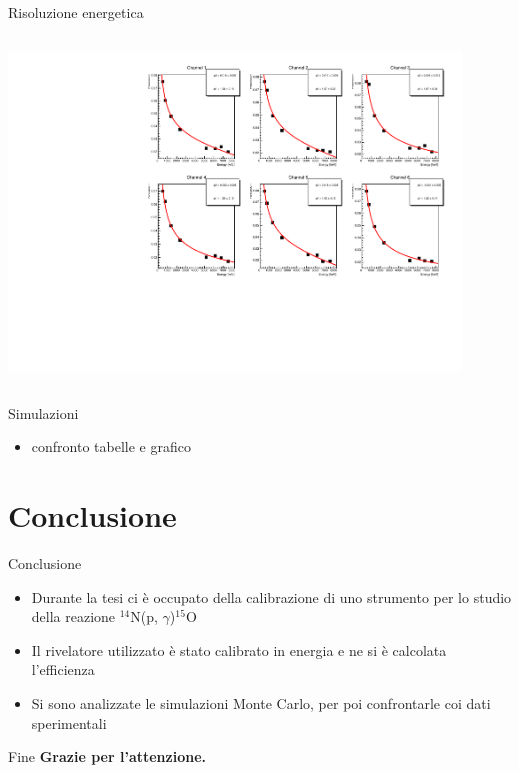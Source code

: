\documentclass [xcolor=svgnames] {beamer}
\begin{document}
\begin{frame}{Risoluzione energetica}
\begin{columns}
\begin{column}{0.5\textwidth}
{				\includegraphics[width=0.9\textwidth]{img/ResolutionGraphs.pdf}}
		\end{column}
	\end{columns}
\end{frame}

\begin{frame}{Simulazioni}
	\begin{itemize}
		\item confronto tabelle e grafico%
	\end{itemize}
\end{frame}
	
	\section{Conclusione}
	\begin{frame}{Conclusione}
		\begin{itemize}
			\item<1-> Durante la tesi ci è occupato della calibrazione di uno strumento per lo studio della reazione  $^{14}$N(p, $\gamma$)$^{15}$O
			\item<2-> Il rivelatore utilizzato è stato calibrato in energia e ne si è calcolata l'efficienza
			\item<3-> Si sono analizzate le simulazioni Monte Carlo, per poi confrontarle coi dati sperimentali
		\end{itemize}
	\end{frame}
	
	\begin{frame}{Fine}
		\centering
		\textbf{Grazie per l'attenzione.}
	\end{frame}
	
\end{document}
